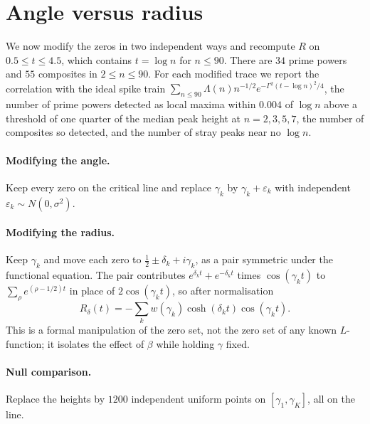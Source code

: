 \documentclass[11pt,a4paper]{article}
\theoremstyle{definition}\newtheorem{definition}[proposition]{Definition}
\theoremstyle{remark}\newtheorem{remark}[proposition]{Remark}
\begin{document}
\section{Angle versus radius}\label{sec:angle-radius}
We now modify the zeros in two independent ways and recompute $R$ on $0.5\le t\le4.5$, which contains $t=\log n$ for $n\le90$. There are $34$ prime powers and $55$ composites in $2\le n\le 90$. For each modified trace we report the correlation with the ideal spike train $\sum_{n\le90}\Lambda(n)n^{-1/2}e^{-\Gamma^2(t-\log n)^2/4}$, the number of prime powers detected as local maxima within $0.004$ of $\log n$ above a threshold of one quarter of the median peak height at $n=2,3,5,7$, the number of composites so detected, and the number of stray peaks near no $\log n$.

\paragraph{Modifying the angle.} Keep every zero on the critical line and replace $\gamma_k$ by $\gamma_k+\varepsilon_k$ with independent $\varepsilon_k\sim N(0,\sigma^2)$.

\paragraph{Modifying the radius.} Keep $\gamma_k$ and move each zero to $\tfrac12\pm\delta_k+i\gamma_k$, as a pair symmetric under the functional equation. The pair contributes $e^{\delta_k t}+e^{-\delta_k t}$ times $\cos(\gamma_k t)$ to $\sum_\rho e^{(\rho-1/2)t}$ in place of $2\cos(\gamma_k t)$, so after normalisation
\[
R_\delta(t)=-\sum_k w(\gamma_k)\cosh(\delta_k t)\cos(\gamma_k t).
\]
This is a formal manipulation of the zero set, not the zero set of any known $L$-function; it isolates the effect of $\beta$ while holding $\gamma$ fixed.

\paragraph{Null comparison.} Replace the heights by $1200$ independent uniform points on $[\gamma_1,\gamma_K]$, all on the line.
\end{document}
